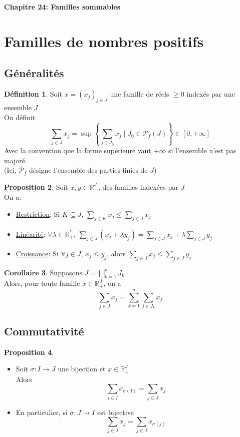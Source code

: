 \documentclass[10pt,a4paper]{article}
\theoremstyle{definition}
\newtheorem{proposition}{Proposition}[section]
\newtheorem{corollaire}[proposition]{Corollaire}
\newtheorem{definition}[proposition]{Définition}
\begin{document}
\renewcommand{\labelitemi}{$*$}
\begin{center}
{\Large \textbf{Chapitre 24: Familles sommables}}
\end{center}
\section{Familles de nombres positifs}
\subsection{Généralités}
\begin{definition}
Soit $x = (x_j)_{j \in J}$ une famille de réels $\geq 0$ indexés par une ensemble $J$ \\
On définit
\[\sum\limits_{j \in J} x_j = \sup \left\{ \sum\limits_{j \in J_0} x_j \mid J_0 \in \mathcal{P}_f(J) \right\} \in [0, +\infty]\]
Avec la convention que la forme supérieure vaut $+\infty$ si l'ensemble n'est pas majoré. \\
(Ici, $\mathcal{P}_f$ désigne l'ensemble des parties finies de $J$)
\end{definition}
\begin{proposition}
Soit $x, y \in \mathbb{R}_+^J$, des familles indexées par $J$ \\
On a:
\begin{itemize}
\item \uline{Restriction}: Si $K \subseteq J$, $\sum\limits_{j \in K} x_j \leq \sum\limits_{j \in J} x_j$
\item \uline{Linéarité}: $\forall \lambda \in \mathbb{R}_+^*$, $\sum\limits_{j \in J} (x_j + \lambda y_j) = \sum\limits_{j \in J} x_j + \lambda \sum_{j \in J} y_j$
\item \uline{Croissance}: Si $\forall j \in J$, $x_j \leq y_j$, alors $\sum\limits_{j \in J} x_j \leq \sum\limits_{j \in J} y_j$
\end{itemize}
\end{proposition}
\begin{corollaire}
Supposons $J = \bigsqcup\limits_{k = 1}^n J_k$ \\
Alors, pour toute famille $x \in \mathbb{R}_+^J$, on a 
\[\sum\limits_{j \in J} x_j = \sum\limits_{k = 1}^n \sum\limits_{j \in J_k} x_j\]
\end{corollaire}

\subsection{Commutativité}
\begin{proposition}
\hfill
\begin{itemize}
\item Soit $\sigma: I \to J$ une bijection et $x \in \mathbb{R}_+^J$ \\
Alors 
\[\sum\limits_{i \in I} x_{\sigma(I)} = \sum\limits_{j \in J} x_j\]
\item En particulier, si $\sigma: J \to I$ est bijective
\[\sum\limits_{j \in J} x_j = \sum\limits_{j \in J} x_{\sigma(j)}\]
\end{itemize}
\end{proposition}
\end{document}
